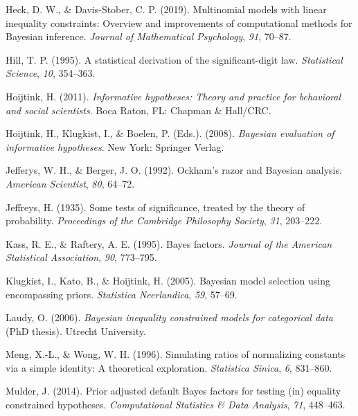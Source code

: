 \documentclass[
  english,
  man,floatsintext]{apa6}
\begin{document}
\leavevmode\hypertarget{ref-heck2019multinomial}{}%
Heck, D. W., \& Davis-Stober, C. P. (2019). Multinomial models with linear inequality constraints: Overview and improvements of computational methods for Bayesian inference. \emph{Journal of Mathematical Psychology}, \emph{91}, 70--87.

\leavevmode\hypertarget{ref-hill1995statistical}{}%
Hill, T. P. (1995). A statistical derivation of the significant-digit law. \emph{Statistical Science}, \emph{10}, 354--363.

\leavevmode\hypertarget{ref-hoijtink2011informative}{}%
Hoijtink, H. (2011). \emph{Informative hypotheses: Theory and practice for behavioral and social scientists}. Boca Raton, FL: Chapman \& Hall/CRC.

\leavevmode\hypertarget{ref-hoijtink2008bayesian}{}%
Hoijtink, H., Klugkist, I., \& Boelen, P. (Eds.). (2008). \emph{Bayesian evaluation of informative hypotheses}. New York: Springer Verlag.

\leavevmode\hypertarget{ref-jefferysberger1992}{}%
Jefferys, W. H., \& Berger, J. O. (1992). Ockham's razor and Bayesian analysis. \emph{American Scientist}, \emph{80}, 64--72.

\leavevmode\hypertarget{ref-jeffreys1935some}{}%
Jeffreys, H. (1935). Some tests of significance, treated by the theory of probability. \emph{Proceedings of the Cambridge Philosophy Society}, \emph{31}, 203--222.

\leavevmode\hypertarget{ref-kass1995bayes}{}%
Kass, R. E., \& Raftery, A. E. (1995). Bayes factors. \emph{Journal of the American Statistical Association}, \emph{90}, 773--795.

\leavevmode\hypertarget{ref-klugkist2005bayesian}{}%
Klugkist, I., Kato, B., \& Hoijtink, H. (2005). Bayesian model selection using encompassing priors. \emph{Statistica Neerlandica}, \emph{59}, 57--69.

\leavevmode\hypertarget{ref-laudy2006bayesian}{}%
Laudy, O. (2006). \emph{Bayesian inequality constrained models for categorical data} (PhD thesis). Utrecht University.

\leavevmode\hypertarget{ref-meng1996simulating}{}%
Meng, X.-L., \& Wong, W. H. (1996). Simulating ratios of normalizing constants via a simple identity: A theoretical exploration. \emph{Statistica Sinica}, \emph{6}, 831--860.

\leavevmode\hypertarget{ref-mulder2014prior}{}%
Mulder, J. (2014). Prior adjusted default Bayes factors for testing (in) equality constrained hypotheses. \emph{Computational Statistics \& Data Analysis}, \emph{71}, 448--463.
\end{document}
